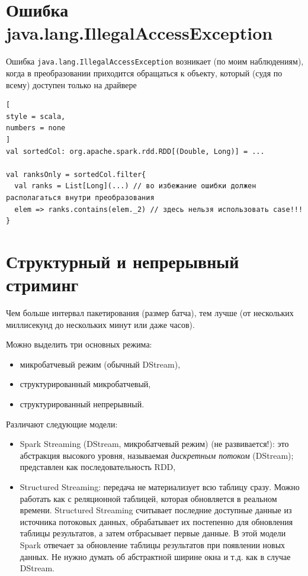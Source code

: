 \documentclass[%
	11pt,
	a4paper,
	utf8,
		]{article}
\begin{document}
\section{Ошибка java.lang.IllegalAccessException}

Ошибка \texttt{java.lang.IllegalAccessException} возникает (по моим наблюдениям), когда в преобразовании приходится обращаться к объекту, который (судя по всему) доступен только на драйвере
\begin{lstlisting}[
style = scala,
numbers = none	
]
val sortedCol: org.apache.spark.rdd.RDD[(Double, Long)] = ...

val ranksOnly = sortedCol.filter{
  val ranks = List[Long](...) // во избежание ошибки должен располагаться внутри преобразования
  elem => ranks.contains(elem._2) // здесь нельзя использовать case!!!
}
\end{lstlisting}




\section{Структурный и непрерывный стриминг}

Чем больше интервал пакетирования (размер батча), тем лучше (от нескольких миллисекунд до нескольких минут или даже часов).

Можно выделить три основных режима: 
\begin{itemize}
	\item микробатчевый режим (обычный DStream),
	
	\item структурированный микробатчевый,
	
	\item структурированный непрерывный.
\end{itemize}

Различают следующие модели:
\begin{itemize}
	\item Spark Streaming (DStream, микробатчевый режим) (не развивается!): это абстракция высокого уровня, называемая \emph{дискретным потоком} (DStream); представлен как последовательность RDD,
	
	\item Structured Streaming: передача не материализует всю таблицу сразу. Можно работать как с реляционной таблицей, которая обновляется в реальном времени. Structured Streaming считывает последние доступные данные из источника потоковых данных, обрабатывает их постепенно для обновления таблицы результатов, а затем отбрасывает первые данные. В этой модели Spark отвечает за обновление таблицы результатов при появлении новых данных. Не нужно думать об абстрактной ширине окна и т.д. как в случае DStream. 
\end{itemize}
\end{document}
